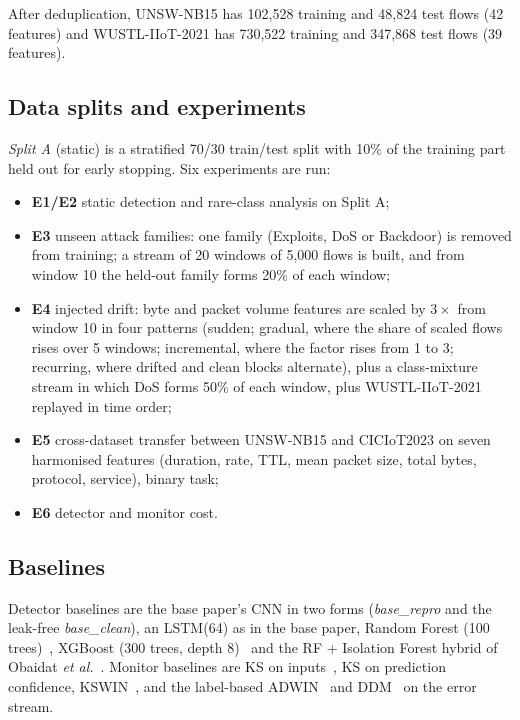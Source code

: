 \documentclass[conference]{IEEEtran}
\begin{document}
After deduplication, UNSW-NB15 has 102{,}528 training and 48{,}824 test flows (42 features) and WUSTL-IIoT-2021 has 730{,}522 training and 347{,}868 test flows (39 features).

\subsection{Data splits and experiments}
\textit{Split A} (static) is a stratified 70/30 train/test split with 10\% of the training part held out for early stopping. Six experiments are run:
\begin{itemize}
\item \textbf{E1/E2} static detection and rare-class analysis on Split A;
\item \textbf{E3} unseen attack families: one family (Exploits, DoS or Backdoor) is removed from training; a stream of 20 windows of 5{,}000 flows is built, and from window 10 the held-out family forms 20\% of each window;
\item \textbf{E4} injected drift: byte and packet volume features are scaled by $3\times$ from window 10 in four patterns (sudden; gradual, where the share of scaled flows rises over 5 windows; incremental, where the factor rises from 1 to 3; recurring, where drifted and clean blocks alternate), plus a class-mixture stream in which DoS forms 50\% of each window, plus WUSTL-IIoT-2021 replayed in time order;
\item \textbf{E5} cross-dataset transfer between UNSW-NB15 and CICIoT2023 on seven harmonised features (duration, rate, TTL, mean packet size, total bytes, protocol, service), binary task;
\item \textbf{E6} detector and monitor cost.
\end{itemize}

\subsection{Baselines}
Detector baselines are the base paper's CNN in two forms (\textit{base\_repro} and the leak-free \textit{base\_clean}), an LSTM(64) as in the base paper, Random Forest (100 trees)~\cite{pedregosa2011}, XGBoost (300 trees, depth 8)~\cite{chen2016xgb} and the RF + Isolation Forest hybrid of Obaidat \textit{et al.}~\cite{obaidat2026}. Monitor baselines are KS on inputs~\cite{obaidat2026}, KS on prediction confidence, KSWIN~\cite{raab2020}, and the label-based ADWIN~\cite{bifet2007} and DDM~\cite{gama2004} on the error stream.
\end{document}
